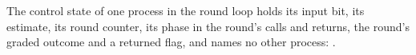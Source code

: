 \begin{definition}
  \label{def:aba-round-loop-state}
  \leanok
  The control state of one process in the round loop holds its input bit, its estimate, its round counter, its phase in the round's calls and returns, the round's graded outcome and a returned flag, and names no other process: .
\end{definition}
